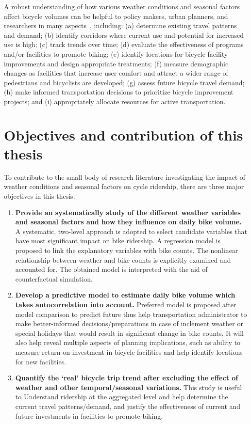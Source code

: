 \documentclass [11pt, proquest] {uwthesis}[2015/03/03]
\begin{document}
A robust understanding of how various weather conditions and seasonal factors affect bicycle volumes can be helpful to policy makers, urban planners, and researchers in many aspects~\cite{LAManual}, including: (a) determine existing travel patterns and demand; (b) identify corridors where current use and potential for increased use is high; (c) track trends over time; (d) evaluate the effectiveness of programs and/or facilities to promote biking; (e) identify locations for bicycle facility improvements and design appropriate treatments; (f) measure demographic changes as facilities that increase user comfort and attract a wider range of pedestrians and bicyclists are developed; (g) assess future bicycle travel demand; (h) make informed transportation decisions to prioritize bicycle improvement projects; and (i) appropriately allocate resources for active transportation.

\section{Objectives and contribution of this thesis}
To contribute to the small body of research literature investigating the impact of weather conditions and seasonal factors on cycle ridership, there are three major objectives in this thesis:
\begin{enumerate}
\item \textbf{Provide an systematically study of the different weather variables and seasonal factors and how they influence on daily bike volume.} A systematic, two-level approach is adopted to select candidate variables that have most significant impact on bike ridership. A regression model is proposed to link the explanatory variables with bike counts. The nonlinear relationship between weather and bike counts is explicitly examined and accounted for. The obtained model is interpreted with the aid of counterfactual simulation. 
\item \textbf{Develop a predictive model to estimate daily bike volume which takes autocorrelation into account.} Preferred model is proposed after model comparison to predict future thus help transportation administrator to make better-informed decisions/preparations in case of inclement weather or special holidays that would result in significant change in bike counts. It will also help reveal multiple aspects of planning implications, such as ability to measure return on investment in bicycle facilities and help identify locations for new facilities. 
\item \textbf{Quantify the `real' bicycle trip trend after excluding the effect of weather and other temporal/seasonal variations.} This study is useful to Understand ridership at the aggregated level and help determine the current travel patterns/demand, and justify the effectiveness of current and future investments in facilities to promote biking.
\end{enumerate}
\end{document}
